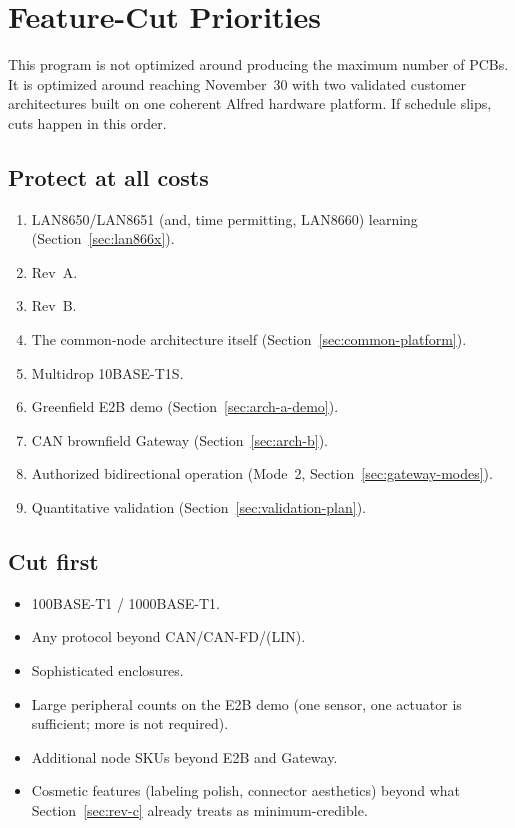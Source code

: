 \section{Feature-Cut Priorities}
\label{sec:feature-cuts}

This program is not optimized around producing the maximum number of PCBs. It is optimized around reaching November~30 with two validated customer architectures built on one coherent Alfred hardware platform. If schedule slips, cuts happen in this order.

\subsection{Protect at all costs}

\begin{enumerate}[itemsep=0.1em]
\item LAN8650/LAN8651 (and, time permitting, LAN8660) learning (Section~\ref{sec:lan866x}).
\item Rev~A.
\item Rev~B.
\item The common-node architecture itself (Section~\ref{sec:common-platform}).
\item Multidrop 10BASE-T1S.
\item Greenfield E2B demo (Section~\ref{sec:arch-a-demo}).
\item CAN brownfield Gateway (Section~\ref{sec:arch-b}).
\item Authorized bidirectional operation (Mode~2, Section~\ref{sec:gateway-modes}).
\item Quantitative validation (Section~\ref{sec:validation-plan}).
\end{enumerate}

\subsection{Cut first}

\begin{itemize}[itemsep=0.1em]
\item 100BASE-T1 / 1000BASE-T1.
\item Any protocol beyond CAN/CAN-FD/(LIN).
\item Sophisticated enclosures.
\item Large peripheral counts on the E2B demo (one sensor, one actuator is sufficient; more is not required).
\item Additional node SKUs beyond E2B and Gateway.
\item Cosmetic features (labeling polish, connector aesthetics) beyond what Section~\ref{sec:rev-c} already treats as minimum-credible.
\end{itemize}

